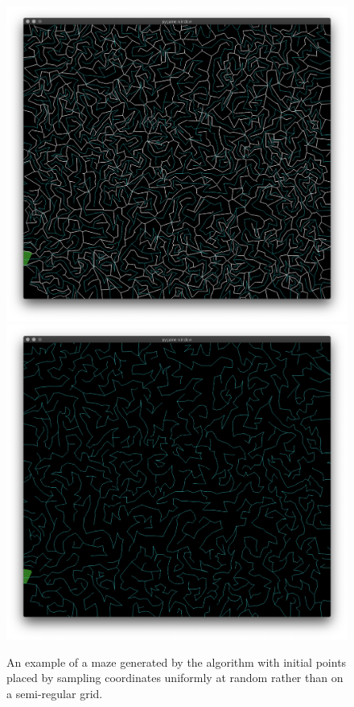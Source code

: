 \documentclass[a4paper,12pt]{article}
\begin{document}
\begin{figure}[ht]
  \centering
  \includegraphics[width=0.7\linewidth]{images/maze-uniform.png}
  \includegraphics[width=0.7\linewidth]{images/maze-uniform-connections.png}
  \caption{An example of a maze generated by the algorithm with initial points placed
    by sampling coordinates uniformly at random rather than on a semi-regular grid.
  \label{fig:maze-uniform}}
\end{figure}

\printbibliography{}
\end{document}
